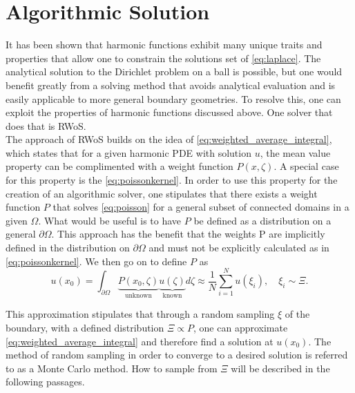 \section{Algorithmic Solution}
It has been shown that harmonic functions exhibit many unique traits and properties
that allow one to constrain the solutions set of \eqref{eq:laplace}.  The analytical solution to
the Dirichlet problem on a ball is possible, but one would benefit greatly
from a solving method that avoids analytical evaluation and is easily applicable to more
general boundary geometries.  To resolve this, one can exploit the properties
of harmonic functions discussed above.  One solver that does that is \Gls{RWoS}.\\
The approach of \gls{RWoS} builds on the idea of \eqref{eq:weighted_average_integral},
which states that for a given harmonic \gls{PDE} with solution $u$, the mean value
property can be complimented with a weight function $P(x,\zeta)$.  A special case
for this property is the \eqref{eq:poissonkernel}.    In order to
use this property for the creation of an algorithmic solver, one stipulates
that there exists a weight function $P$ that solves \eqref{eq:poisson} for a general subset of connected domains
in a given $\Omega.$ What would be useful is to have $P$ be defined as a distribution
on a general $\partial \Omega$.  This approach has the benefit that the weights P are
implicitly defined in the distribution on $\partial \Omega$ and must not be
explicitly calculated as in \eqref{eq:poissonkernel}. We then go on to define $P$ as
\begin{equation}
  u(x_{0})= \int_{\partial \Omega} \underbrace{P(x_{0},\zeta)}_\text{unknown}
   \underbrace{u(\zeta)}_\text{known} d\zeta \approx \frac{1}{N} \sum_{i=1}^{N} u(\xi_{i}),
   \quad \xi_{i} \sim \Xi.
\end{equation}

This approximation stipulates that through a random sampling $\xi$ of the boundary, with
a defined distribution $\Xi \propto P$, one can approximate \eqref{eq:weighted_average_integral} and therefore
find a solution at $u(x_{0})$.  The method of random sampling in order to converge to a desired solution
is referred to as a Monte Carlo method.  How to sample from $\Xi$ will be described in the following passages.
\par

